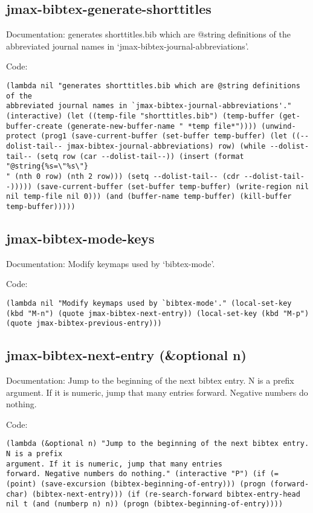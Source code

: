 \documentclass[11pt]{article}
\begin{document}
\subsection{jmax-bibtex-generate-shorttitles}
\label{sec-2-2}
Documentation: generates shorttitles.bib which are @string definitions of the
abbreviated journal names in `jmax-bibtex-journal-abbreviations'.

Code:
\begin{verbatim}
(lambda nil "generates shorttitles.bib which are @string definitions of the
abbreviated journal names in `jmax-bibtex-journal-abbreviations'." (interactive) (let ((temp-file "shorttitles.bib") (temp-buffer (get-buffer-create (generate-new-buffer-name " *temp file*")))) (unwind-protect (prog1 (save-current-buffer (set-buffer temp-buffer) (let ((--dolist-tail-- jmax-bibtex-journal-abbreviations) row) (while --dolist-tail-- (setq row (car --dolist-tail--)) (insert (format "@string{%s=\"%s\"}
" (nth 0 row) (nth 2 row))) (setq --dolist-tail-- (cdr --dolist-tail--))))) (save-current-buffer (set-buffer temp-buffer) (write-region nil nil temp-file nil 0))) (and (buffer-name temp-buffer) (kill-buffer temp-buffer)))))
\end{verbatim}
\subsection{jmax-bibtex-mode-keys}
\label{sec-2-3}
Documentation: Modify keymaps used by `bibtex-mode'.

Code:
\begin{verbatim}
(lambda nil "Modify keymaps used by `bibtex-mode'." (local-set-key (kbd "M-n") (quote jmax-bibtex-next-entry)) (local-set-key (kbd "M-p") (quote jmax-bibtex-previous-entry)))
\end{verbatim}
\subsection{jmax-bibtex-next-entry (\&optional n)}
\label{sec-2-4}
Documentation: Jump to the beginning of the next bibtex entry. N is a prefix
argument. If it is numeric, jump that many entries
forward. Negative numbers do nothing.

Code:
\begin{verbatim}
(lambda (&optional n) "Jump to the beginning of the next bibtex entry. N is a prefix
argument. If it is numeric, jump that many entries
forward. Negative numbers do nothing." (interactive "P") (if (= (point) (save-excursion (bibtex-beginning-of-entry))) (progn (forward-char) (bibtex-next-entry))) (if (re-search-forward bibtex-entry-head nil t (and (numberp n) n)) (progn (bibtex-beginning-of-entry))))
\end{verbatim}
\end{document}
